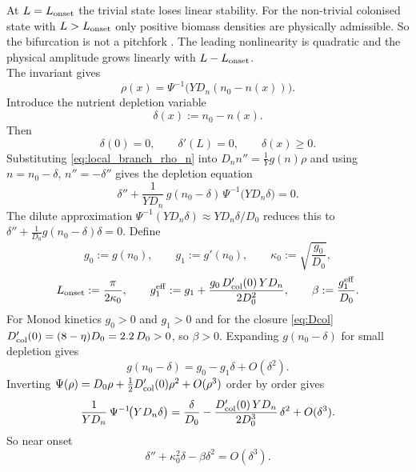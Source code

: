 \documentclass[11pt,a4paper]{report}
\begin{document}
	At $L=L_{\rm onset}$ the trivial state loses linear stability. For the
	non-trivial colonised state with $L>L_{\rm onset}$ only positive biomass densities are physically admissible.
	So the bifurcation is not a pitchfork \cite{bifurcation}.  The leading nonlinearity
	is quadratic and the physical amplitude grows linearly with
	$L-L_{\rm onset}$.\\
The invariant gives
\begin{equation}
	\rho(x)=\Psi^{-1}\!\bigl(YD_n(n_0-n(x))\bigr).
	\label{eq:local_branch_rho_n}
\end{equation}
	Introduce the nutrient depletion variable
	\begin{equation}
		\delta(x):=n_0-n(x).
		\label{eq:delta_def_local}
	\end{equation}
	Then
	\[
	\delta(0)=0,
	\qquad
	\delta'(L)=0,
	\qquad
	\delta(x)\ge0.
	\]
	Substituting \eqref{eq:local_branch_rho_n} into $D_n n''=\frac1Y g(n)\rho$ and using $n=n_0-\delta$, $n''=-\delta''$ gives the depletion equation
	\begin{equation}
		{
			\delta''+\frac{1}{YD_n}\,g(n_0-\delta)\,\Psi^{-1}\!\bigl(YD_n\delta\bigr)=0.
		}
		\label{eq:delta_full_monod}
	\end{equation}
	The dilute approximation $\Psi^{-1}(YD_n\delta)\approx YD_n\delta/D_0$ reduces this to $\delta''+\frac{1}{D_0}g(n_0-\delta)\delta=0$.
	Define
	\begin{equation}
			g_0:=g(n_0),\qquad g_1:=g'(n_0),\qquad
		\kappa_0:=\sqrt{\frac{g_0}{D_0}},
	\end{equation}
\begin{equation}
		L_{\rm onset}:=\frac{\pi}{2\kappa_0},\qquad
		g_1^{\rm eff}:=g_1+\frac{g_0\,D_{\rm col}'(0)\,YD_n}{2D_0^2},\qquad
		\beta:=\frac{g_1^{\rm eff}}{D_0}.
		\label{eq:g0_g1_kappa_local}
	\end{equation}
	For Monod kinetics $g_0>0$ and $g_1>0$ and for the closure \eqref{eq:Dcol} $D_{\rm col}'(0)=(8-\eta)D_0=2.2\,D_0>0$, so $\beta>0$.  Expanding
	$g(n_0-\delta)$ for small depletion gives
	\begin{equation}
		g(n_0-\delta)
		=
		g_0-g_1\delta+O(\delta^2).
		\label{eq:g_expand_local}
	\end{equation}
Inverting $\Psi(\rho)=D_0\rho+\tfrac12D_{\rm col}'(0)\rho^2+O(\rho^3)$ order by order gives
\begin{equation}
	\frac{1}{YD_n}\,\Psi^{-1}\!\bigl(YD_n\delta\bigr)
	=\frac{\delta}{D_0}-\frac{D_{\rm col}'(0)\,YD_n}{2D_0^3}\,\delta^2+O(\delta^3).
	\label{eq:Psiinv_expand_local}
\end{equation}
	So near onset
	\begin{equation}
		\delta''
		+
		\kappa_0^2\delta
		-
		\beta\delta^2
		=
		O(\delta^3).
		\label{eq:delta_local_expanded}
	\end{equation}
	
\end{document}
